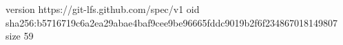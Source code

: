 version https://git-lfs.github.com/spec/v1
oid sha256:b5716719c6a2ea29abae4baf9cee9be96665fddc9019b2f6f234867018149807
size 59
